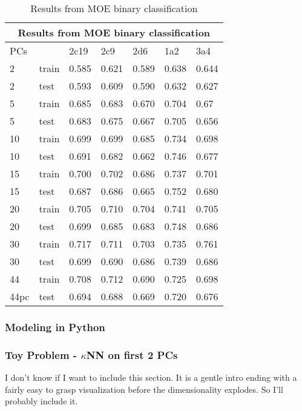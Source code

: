 
\begin{table}[!htbp]
\begin{tabular}{|l|l|l|l|l|l|l|}
\hline
\multicolumn{7}{|c|}{Results from MOE binary classification}                        \\ \hline
PCs  &       & 2c19  & 2c9   & 2d6   & 1a2   & 3a4   \\ \hline
2    & train & 0.585 & 0.621 & 0.589 & 0.638 & 0.644 \\ \hline
2    & test  & 0.593 & 0.609 & 0.590 & 0.632 & 0.627 \\ \hline
5    & train & 0.685 & 0.683 & 0.670 & 0.704 & 0.67  \\ \hline
5    & test  & 0.683 & 0.675 & 0.667 & 0.705 & 0.656 \\ \hline
10   & train & 0.699 & 0.699 & 0.685 & 0.734 & 0.698 \\ \hline
10   & test  & 0.691 & 0.682 & 0.662 & 0.746 & 0.677 \\ \hline
15   & train & 0.700 & 0.702 & 0.686 & 0.737 & 0.701 \\ \hline
15   & test  & 0.687 & 0.686 & 0.665 & 0.752 & 0.680 \\ \hline
20   & train & 0.705 & 0.710 & 0.704 & 0.741 & 0.705 \\ \hline
20   & test  & 0.699 & 0.685 & 0.683 & 0.748 & 0.686 \\ \hline
30   & train & 0.717 & 0.711 & 0.703 & 0.735 & 0.761 \\ \hline
30   & test  & 0.699 & 0.690 & 0.686 & 0.739 & 0.686 \\ \hline
44   & train & 0.708 & 0.712 & 0.690 & 0.725 & 0.698 \\ \hline
44pc & test  & 0.694 & 0.688 & 0.669 & 0.720 & 0.676 \\ \hline
\end{tabular}
\caption{Results from MOE binary classification}
\end{table}

\subsubsection{Modeling in Python}
\subsubsection{Toy Problem - $\kappa$NN on first 2 PCs}
I don't know if I want to include this section. It is a gentle intro ending with a fairly easy to grasp visualization before the dimensionality explodes. So I'll probably include it.

